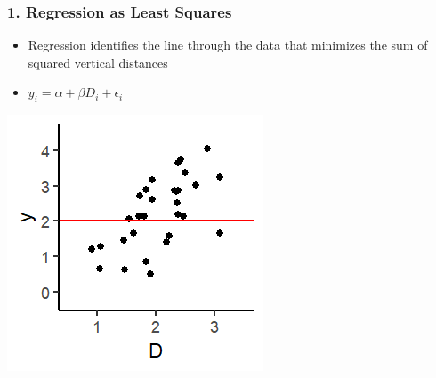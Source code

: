 \documentclass[xcolor=x11names,compress]{beamer}\usepackage[]{graphicx}\usepackage[]{color}
\makeatletter
\def\maxwidth{ %
  \ifdim\Gin@nat@width>\linewidth
    \linewidth
  \else
    \Gin@nat@width
  \fi
}
\newenvironment{knitrout}{}{} %
\renewcommand{\(}{\begin{columns}}
\renewcommand{\)}{\end{columns}}
\newcommand{\<}[1]{\begin{column}{#1}}
\renewcommand{\>}{\end{column}}
\makeatother
\begin{document}
\begin{frame}
\frametitle{1. Regression as Least Squares}
\begin{itemize}
\item Regression identifies the line through the data that minimizes the sum of squared vertical distances 
\item $y_i = \alpha + \beta D_i + \epsilon_i$
\end{itemize}
\begin{multicols}{2}
\begin{knitrout}
\color{fgcolor}
\includegraphics[width=\maxwidth]{figure/graph_ols0b-1} 

\end{knitrout}
\columnbreak
 
\end{multicols}
\end{frame}
\end{document}
